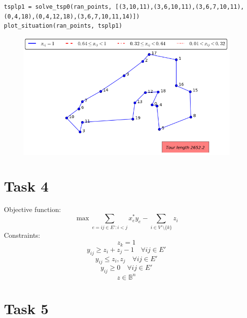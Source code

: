 \documentclass[a4paper,10pt]{article}
\begin{document}
\begin{lstlisting}
tsplp1 = solve_tsp0(ran_points, [(3,10,11),(3,6,10,11),(3,6,7,10,11),(0,4,18),(0,4,12,18),(3,6,7,10,11,14)])
plot_situation(ran_points, tsplp1)
\end{lstlisting}

\begin{figure}[htb]
\begin{center}
\includegraphics[scale=1.4/textwidth]{task3.3.png}
\end{center}
\end{figure}

\newpage
\section*{Task 4}

Objective function:
$$ \max \sum_{e=ij\in E':i < j} x^*_e y_e - \sum_{i \in V' \setminus \{k\}} z_i $$
Constraints:
$$ z_k = 1 $$
$$ y_{ij} \geq z_i + z_j - 1 \quad \forall ij \in E' $$
$$ y_{ij} \leq z_i,z_j \quad \forall ij \in E' $$
$$ y_{ij} \geq 0 \quad \forall ij \in E' $$
$$ z \in \mathbb{B}^n $$

\newpage
\section*{Task 5}
\end{document}
